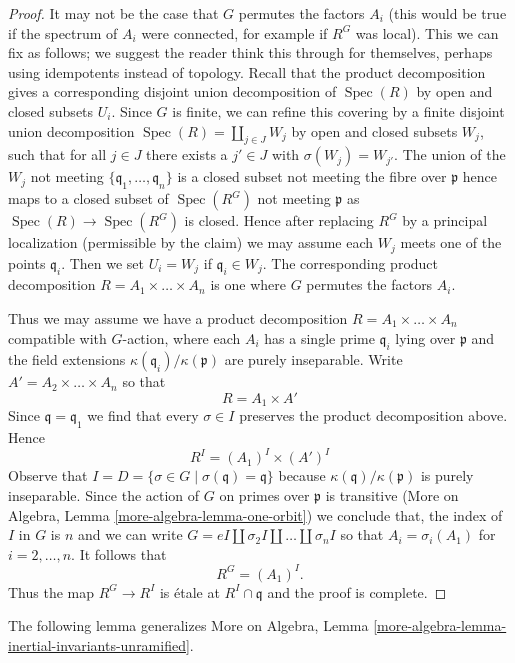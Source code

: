 \documentclass{stacks-project}
\theoremstyle{plain}
\theoremstyle{definition}
\theoremstyle{remark}
\numberwithin{equation}{subsection}
\def\Spec{\mathop{\mathrm{Spec}}}
\begin{document}
\begin{proof}
\medskip\noindent
It may not be the case that $G$ permutes the factors $A_i$
(this would be true if the spectrum of $A_i$ were connected,
for example if $R^G$ was local). This we can fix as follows;
we suggest the reader think this through for themselves, perhaps
using idempotents instead of topology.
Recall that the product decomposition gives a corresponding
disjoint union decomposition of $\Spec(R)$ by open and closed
subsets $U_i$. Since $G$ is finite, we can refine this covering
by a finite disjoint union decomposition
$\Spec(R) = \coprod_{j \in J} W_j$ by open
and closed subsets $W_j$, such that for all $j \in J$ there exists
a $j' \in J$ with $\sigma(W_j) = W_{j'}$. The union of the
$W_j$ not meeting $\{\mathfrak q_1, \ldots, \mathfrak q_n\}$
is a closed subset not meeting the fibre over $\mathfrak p$
hence maps to a closed subset of $\Spec(R^G)$ not meeting
$\mathfrak p$ as $\Spec(R) \to \Spec(R^G)$ is closed.
Hence after replacing $R^G$ by a principal localization
(permissible by the claim) we may assume each $W_j$ meets
one of the points $\mathfrak q_i$. Then we set $U_i = W_j$
if $\mathfrak q_i \in W_j$. The corresponding product decomposition
$R = A_1 \times \ldots \times A_n$ is one
where $G$ permutes the factors $A_i$.

\medskip\noindent
Thus we may assume we have a product decomposition
$R = A_1 \times \ldots \times A_n$ compatible with $G$-action,
where each $A_i$ has a single prime $\mathfrak q_i$ lying
over $\mathfrak p$ and the field extensions
$\kappa(\mathfrak q_i)/\kappa(\mathfrak p)$ are purely inseparable.
Write $A' = A_2 \times \ldots \times A_n$ so that
$$
R = A_1 \times A'
$$
Since $\mathfrak q = \mathfrak q_1$ we find that every
$\sigma \in I$ preserves the product decomposition above.
Hence
$$
R^I = (A_1)^I \times (A')^I
$$
Observe that $I = D = \{\sigma \in G \mid \sigma(\mathfrak q) = \mathfrak q\}$
because $\kappa(\mathfrak q)/\kappa(\mathfrak p)$ is purely inseparable.
Since the action of $G$ on primes over $\mathfrak p$ is transitive
(More on Algebra, Lemma \ref{more-algebra-lemma-one-orbit})
we conclude that, the index of $I$ in $G$ is $n$ and we can write
$G = eI \amalg \sigma_2I \amalg \ldots \amalg \sigma_nI$ so that
$A_i = \sigma_i(A_1)$ for $i = 2, \ldots, n$. It follows that
$$
R^G = (A_1)^I.
$$
Thus the map $R^G \to R^I$ is \'etale at $R^I \cap \mathfrak q$
and the proof is complete.
\end{proof}

\noindent
The following lemma generalizes
More on Algebra, Lemma \ref{more-algebra-lemma-inertial-invariants-unramified}.
\end{document}
